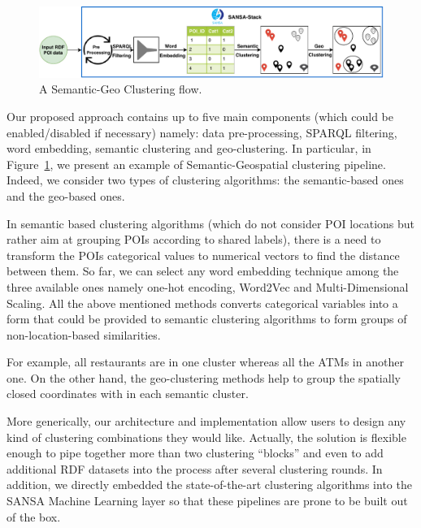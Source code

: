\begin{figure}
    \centering
	\includegraphics[width=\textwidth]{images/7_implemenation_and_usecases/KmeansPaper8.pdf}
	\caption{A Semantic-Geo Clustering flow.}
	\label{fig:imp-use-case-clustering}
\end{figure}

Our proposed approach contains up to five main components (which could be enabled/disabled if necessary) namely: data pre-processing, \gls{SPARQL} filtering, word embedding, semantic clustering and geo-clustering.
In particular, in Figure~\ref{fig:imp-use-case-clustering}, we present an example of Semantic-Geospatial clustering pipeline.
Indeed, we consider two types of clustering algorithms: the semantic-based ones and the geo-based ones.

In semantic based clustering algorithms (which do not consider POI locations but rather aim at grouping \gls{POI}s according to shared labels), there is a need to transform the \gls{POI}s categorical values to numerical vectors to find the distance between them. 
So far, we can select any word embedding technique among the three available ones namely one-hot encoding, Word2Vec and Multi-Dimensional Scaling.
All the above mentioned methods converts categorical variables into a form that could be provided to semantic clustering algorithms to form groups of non-location-based similarities.

For example, all restaurants are in one cluster whereas all the ATMs in another one.
On the other hand, the geo-clustering methods help to group the spatially closed coordinates with in each semantic cluster.

More generically, our architecture and implementation allow users to design any kind of clustering combinations they would like. Actually, the solution is flexible enough to pipe together more than two clustering ``blocks'' and even to add additional \gls{RDF} datasets into the process after several clustering rounds. In addition, we directly embedded the state-of-the-art clustering algorithms into the SANSA Machine Learning layer so that these pipelines are prone to be built out of the box.


